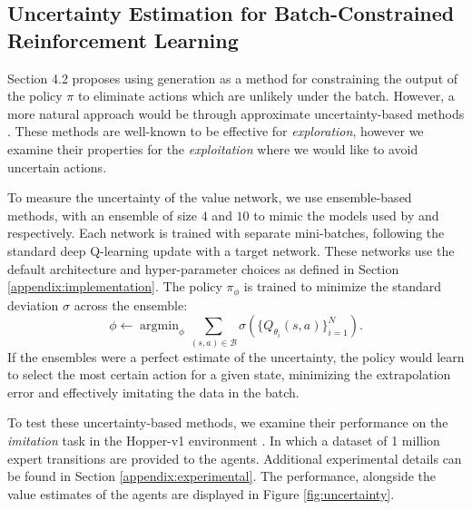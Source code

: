 \documentclass{article}
\newcommand{\ta}{\theta}
\newcommand{\lp}{\left (}
\newcommand{\rp}{\right )}
\newcommand{\B}{\mathcal{B}}
\DeclareMathOperator*{\argmin}{argmin}
\begin{document}
\newpage

\subsection{Uncertainty Estimation for Batch-Constrained Reinforcement Learning} 

Section 4.2 proposes using generation as a method for constraining the output of the policy $\pi$ to eliminate actions which are unlikely under the batch. However, a more natural approach would be through approximate uncertainty-based methods \cite{osband2016deep, gal2016improving, azizzadenesheli2018bayesian}. These methods are well-known to be effective for \textit{exploration}, however we examine their properties for the \textit{exploitation} where we would like to avoid uncertain actions. 

To measure the uncertainty of the value network, we use ensemble-based methods, with an ensemble of size $4$ and $10$ to mimic the models used by \citet{buckman2018sample} and \citet{osband2016deep} respectively. Each network is trained with separate mini-batches, following the standard deep Q-learning update with a target network. These networks use the default architecture and hyper-parameter choices as defined in Section \ref{appendix:implementation}. The policy $\pi_\phi$ is trained to minimize the standard deviation $\sigma$ across the ensemble:
\begin{equation}
    \phi \leftarrow \argmin_\phi \sum_{(s,a) \in \B} \sigma \lp \{ Q_{\ta_i}(s,a) \}_{i=1}^N \rp .
\end{equation}
If the ensembles were a perfect estimate of the uncertainty, the policy would learn to select the most certain action for a given state, minimizing the extrapolation error and effectively imitating the data in the batch. 

To test these uncertainty-based methods, we examine their performance on the \textit{imitation} task in the Hopper-v1 environment \cite{mujoco, OpenAIGym}. In which a dataset of 1 million expert transitions are provided to the agents. Additional experimental details can be found in Section \ref{appendix:experimental}. The performance, alongside the value estimates of the agents are displayed in Figure \ref{fig:uncertainty}.  
\end{document}
